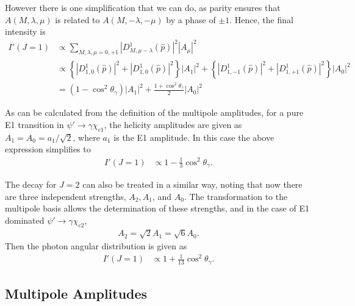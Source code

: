 \documentclass[11pt]{article}
\begin{document}
However there is one simplification that we can do, as parity ensures
that $A(M,\lambda, \mu)$ is related to $A(M,-\lambda,-\mu)$ by a phase
of $\pm 1$. Hence, the final intensity is
\begin{align}
  I' (J=1) &\propto  \sum_{M, \lambda, \mu=0,+1} \left| D^{1}_{M,\mu-\lambda}
  (\hat{p}) \right|^{2} \left| A_{\mu} \right|^{2} \\
  &\propto \left\{
    \left| D^{1}_{1,0} (\hat{p}) \right|^{2}
    + \left| D^{1}_{1,0} (\hat{p}) \right|^{2}
    \right\}
  \left| A_{1} \right|^{2}
  +
  \left\{
    \left| D^{1}_{1,-1} (\hat{p}) \right|^{2}
    + \left| D^{1}_{1,+1} (\hat{p}) \right|^{2}
    \right\}
  \left| A_{0} \right|^{2} \\
  &= (1 - \cos^{2}\theta_{\gamma}) \left| A_{1} \right|^{2} + \frac{1
    + \cos^{2} \theta_{\gamma}}{2} \left| A_{0} \right|^{2}
\end{align}

As can be calculated from the definition of the multipole amplitudes,
for a pure E1 transition in $\psi' \to \gamma
\chi_{c1}$, the helicity amplitudes are given as $A_{1} = A_{0} =
a_{1} / \sqrt{2}$, where $a_{1}$ is the E1 amplitude. In this case the
above expression simplifies to
\begin{align}
  I' (J=1) &\propto  1 - \frac{1}{3} \cos^{2} \theta_{\gamma}.
\end{align}

The decay for $J=2$ can also be treated in a similar way, noting that
now there are three independent strengths, $A_{2}, A_{1}$, and
$A_{0}$. The transformation to the multipole basis allows the
determination of these strengths, and in the case of E1 dominated
$\psi' \to \gamma \chi_{c2}$,
\begin{align}
  A_{2} = \sqrt{2} A_{1} = \sqrt{6} A_{0}.
\end{align}
Then the photon angular distribution is given as
\begin{align}
  I' (J=1) &\propto  1 + \frac{1}{13} \cos^{2} \theta_{\gamma}.
\end{align}

\subsection{Multipole Amplitudes}
\end{document}
